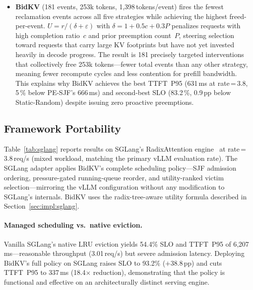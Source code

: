 \documentclass[sigconf,nonacm]{acmart}
\newcommand{\bidkv}{BidKV\xspace}
\begin{document}
\begin{itemize}[leftmargin=*,nosep]
\item \textbf{\bidkv} (181 events, 253k tokens, 1{,}398\,tokens/event) fires
  the fewest reclamation events across all five strategies while achieving the
  highest freed-per-event.  $U = r / (\delta + \varepsilon)$ with
  $\delta = 1 + 0.5c + 0.3P$ penalizes requests with high completion
  ratio~$c$ and prior preemption count~$P$, steering selection toward requests
  that carry large KV footprints but have not yet invested heavily in decode
  progress.  The result is 181 precisely targeted interventions that
  collectively free 253k tokens---fewer total events than any other strategy,
  meaning fewer recompute cycles and less contention for prefill bandwidth.
  This explains why \bidkv achieves the best TTFT~P95 (631\,ms at
  rate\,=\,3.8, 5\,\% below PE-SJF's 666\,ms) and second-best SLO
  (83.2\,\%, 0.9\,pp below Static-Random) despite issuing zero proactive
  preemptions.
\end{itemize}

\subsection{Framework Portability}\label{sec:eval:sglang}



Table~\ref{tab:sglang} reports results on SGLang's RadixAttention
engine~\cite{Zheng2024sglang} at rate\,=\,3.8\,req/s (mixed workload,
matching the primary vLLM evaluation rate).  The SGLang adapter applies
\bidkv's complete scheduling policy---SJF admission ordering,
pressure-gated running-queue reorder, and utility-ranked victim
selection---mirroring the vLLM configuration without any modification to
SGLang's internals.  \bidkv uses the radix-tree-aware utility formula
described in Section~\ref{sec:impl:sglang}.

\paragraph{Managed scheduling vs.~native eviction.}
Vanilla SGLang's native LRU eviction yields 54.4\% SLO and
TTFT~P95 of 6{,}207\,ms---reasonable throughput (3.01\,req/s) but severe
admission latency.  Deploying \bidkv's full policy on SGLang raises SLO to
93.2\% ($+$38.8\,pp) and cuts TTFT~P95 to 337\,ms (18.4$\times$ reduction),
demonstrating that the policy is functional and effective on an
architecturally distinct serving engine.
\end{document}
